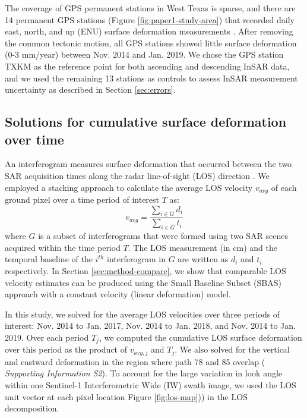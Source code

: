 The coverage of GPS permanent stations in West Texas is sparse, and there are 14 permanent GPS stations (Figure \ref{fig:paper1-study-area}) that recorded daily east, north, and up (ENU) surface deformation measurements \citep{Blewitt2018HarnessingGpsData}. After removing the common tectonic motion, all GPS stations showed little surface deformation (0-3 mm/year) between Nov. 2014 and Jan. 2019. We chose the GPS station TXKM as the reference point for both ascending and descending InSAR data, and we used the remaining 13 stations as controls to assess InSAR measurement uncertainty as described in Section \ref{sec:errors}.

\subsection{Solutions for cumulative surface deformation over time}
\label{sec:stacking}
An interferogram measures surface deformation that occurred between the two SAR acquisition times along the radar line-of-sight (LOS) direction \citep{Hanssen2001RadarInterferometryData}. We employed a stacking approach \citep{Sandwell1998PhaseGradientApproach} to calculate the average LOS velocity $v_{avg}$ of each ground pixel over a time period of interest $T$ as:
\begin{equation}
	v_{avg} = \frac{\sum_{i \in G} d_i}{\sum_{i \in G} t_i}
	\label{eq:stacking}
\end{equation}
where $G$ is a subset of interferograms that were formed using two SAR scenes acquired within the time period $T$. The LOS measurement (in cm) and the temporal baseline of the $i^{th}$ interferogram in $G$ are written as $d_i$ and $ t_i $ respectively. In Section \ref{sec:method-compare}, we show that comparable LOS velocity estimates can be produced using the Small Baseline Subset (SBAS) approach \citep{Berardino2002NewAlgorithmSurface} with a constant velocity (linear deformation) model.

In this study, we solved for the average LOS velocities over three periods of interest: Nov. 2014 to Jan. 2017, Nov. 2014 to Jan. 2018, and Nov. 2014 to Jan. 2019. Over each period $T_j$, we computed the cumulative LOS surface deformation over this period as the product of $v_{avg,j}$ and $T_j$. We also solved for the vertical and eastward deformation in the region where path 78 and 85 overlap ( \textit{Supporting Information S2}). To account for the large variation in look angle within one Sentinel-1 Interferometric Wide (IW) swath image, we used the LOS unit vector at each pixel location Figure \ref{fig:los-map})) in the LOS decomposition.


